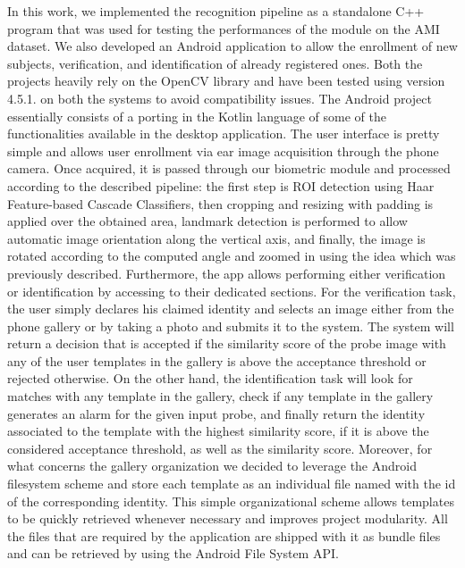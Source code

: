 \documentclass{article}
\begin{document}
In this work, we implemented the recognition pipeline as a standalone C++ program that was used for
testing the performances of the module on the AMI dataset. We also developed an Android application
to allow the enrollment of new subjects, verification, and identification of already registered ones.
Both the projects heavily rely on the OpenCV library \cite{opencv_library} and have been tested using
version 4.5.1. on both the systems to avoid compatibility issues. The Android project essentially consists
of a porting in the Kotlin language of some of the functionalities available in the desktop application.
The user interface is pretty simple and allows user enrollment via ear image acquisition through the phone
camera. Once acquired, it is passed through our biometric module and processed according to the described pipeline:
the first step is ROI detection using Haar Feature-based Cascade Classifiers, then cropping and resizing with
padding is applied over the obtained area, landmark detection is performed to allow automatic image orientation
along the vertical axis, and finally, the image is rotated according to the computed angle and zoomed in using
the idea which was previously described.
Furthermore, the app allows performing either verification or identification by accessing to their dedicated sections.
For the verification task, the user simply declares his claimed identity and selects an image either from the phone
gallery or by taking a photo and submits it to the system. The system will return a decision that is accepted if the
similarity score of the probe image with any of the user templates in the gallery is above the acceptance threshold
or rejected otherwise. On the other hand, the identification task will look for matches with any template in the
gallery, check if any template in the gallery generates an alarm for the given input probe, and finally return
the identity associated to the template with the highest similarity score, if it is above the considered acceptance
threshold, as well as the similarity score.
Moreover, for what concerns the gallery organization we decided to leverage the Android filesystem scheme and
store each template as an individual file named with the id of the corresponding identity. This simple organizational
scheme allows templates to be quickly retrieved whenever necessary and improves project modularity. All the files that
are required by the application are shipped with it as bundle files and can be retrieved by using the
Android File System API.
\end{document}
